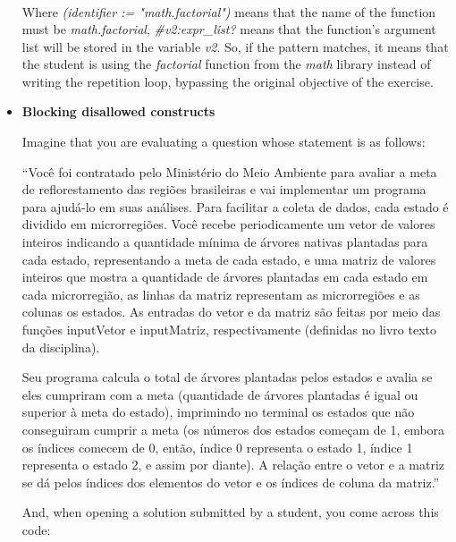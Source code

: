\begin{itemize}
\[\begin{array}{l}
        \end{array}
    \]
    
    Where \textit{(identifier := "math.factorial")} means that the name of the 
    function must be \textit{math.factorial}, \textit{\#v2:expr\_list?} means 
    that the function's argument list will be stored in the variable \textit{v2}.
    So, if the pattern matches, it means that the student is using the 
    \textit{factorial} function from the \textit{math} library instead of writing 
    the repetition loop, bypassing the original objective of the exercise.


    \item \textbf{Blocking disallowed constructs}
    
    Imagine that you are evaluating a question whose statement is as follows:

    ``Você foi contratado pelo Ministério do Meio Ambiente para avaliar a meta de 
    reflorestamento das regiões brasileiras e vai implementar um programa para 
    ajudá-lo em suas análises. Para facilitar a coleta de dados, cada estado é 
    dividido em microrregiões. Você recebe periodicamente um vetor de valores 
    inteiros indicando a quantidade mínima de árvores nativas plantadas para cada 
    estado, representando a meta de cada estado, e uma matriz de valores inteiros 
    que mostra a quantidade de árvores plantadas em cada estado em cada microrregião,
    as linhas da matriz representam as microrregiões e as colunas os estados. 
    As entradas do vetor e da matriz são feitas por meio das funções inputVetor e 
    inputMatriz, respectivamente (definidas no livro texto da disciplina).

    Seu programa calcula o total de árvores plantadas pelos estados e avalia se eles 
    cumpriram com a meta (quantidade de árvores plantadas é igual ou superior à meta 
    do estado), imprimindo no terminal os estados que não conseguiram cumprir a meta 
    (os números dos estados começam de 1, embora os índices comecem de 0, então, índice 
    0 representa o estado 1, índice 1 representa o estado 2, e assim por diante). 
    A relação entre o vetor e a matriz se dá pelos índices dos elementos do vetor e os 
    índices de coluna da matriz.''

    And, when opening a solution submitted by a student, you come across this code:


\end{itemize}
